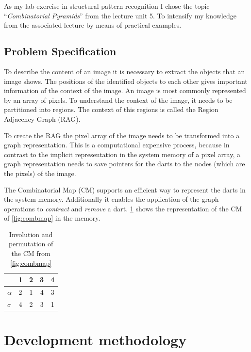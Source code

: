 \documentclass[12pt]{article}
\begin{document}
As my lab exercise in structural pattern recognition I chose the topic ``\emph{Combinatorial Pyramids}'' from the lecture unit 5. To intensify my knowledge from the associated lecture by means of practical examples.


\subsection{Problem Specification} %
\label{sub:problem}

To describe the content of an image it is necessary to extract the objects that an image shows.
The positions of the identified objects to each other gives important information of the context of the image.
An image is most commonly represented by an array of pixels.
To understand the context of the image, it needs to be partitioned into regions.
The context of this regions is called the Region Adjacency Graph (RAG).
\par
To create the RAG the pixel array of the image needs to be transformed into a graph representation.
This is a computational expensive process, because in contrast to the implicit representation in the system memory of a pixel array, a graph representation needs to save pointers for the darts to the nodes (which are the pixels) of the image.
\par
The Combinatorial Map (CM) supports an efficient way to represent the darts in the system memory.
Additionally it enables the application of the graph operations to \emph{contract} and \emph{remove} a dart. \cref{tab:combmap} shows the representation of the CM of \cref{fig:combmap} in the memory.

\begin{table}[tb]
  \caption{Involution and permutation of the CM from \cref{fig:combmap}}\label{tab:combmap}
  \centering

  \begin{tabular}{lcccc}
  & \textbf{1} & \textbf{2} & \textbf{3} & \textbf{4} \\
  \midrule
     \( \alpha \)& 2 & 1 & 4 & 3\\
     \( \sigma \)& 4 & 2 & 3 & 1\\
  \bottomrule
  \end{tabular}
\end{table}


\section{Development methodology} %
\label{sec:development_methodology}
\end{document}
